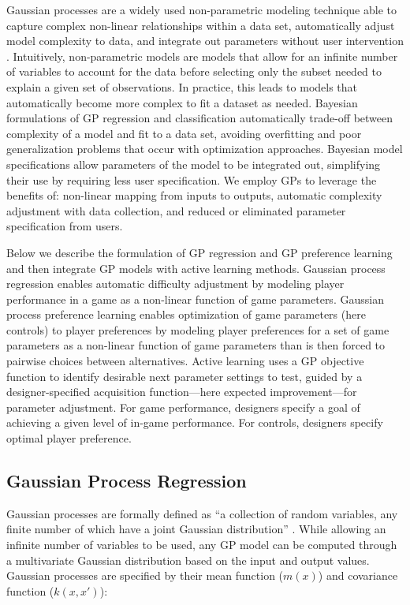 \documentclass[letterpaper]{article}
\begin{document}
Gaussian processes are a widely used non-parametric modeling technique able to capture complex non-linear relationships within a data set, automatically adjust model complexity to data, and integrate out parameters without user intervention \cite{rasmussen2006}. Intuitively, non-parametric models are models that allow for an infinite number of variables to account for the data before selecting only the subset needed to explain a given set of observations. In practice, this leads to models that automatically become more complex to fit a dataset as needed. Bayesian formulations of GP regression and classification automatically trade-off between complexity of a model and fit to a data set, avoiding overfitting and poor generalization problems that occur with optimization approaches. Bayesian model specifications allow parameters of the model to be integrated out, simplifying their use by requiring less user specification. We employ GPs to leverage the benefits of: non-linear mapping from inputs to outputs, automatic complexity adjustment with data collection, and reduced or eliminated parameter specification from users.

Below we describe the formulation of GP regression and GP preference learning and then integrate GP models with active learning methods. Gaussian process regression enables automatic difficulty adjustment by modeling player performance in a game as a non-linear function of game parameters. Gaussian process preference learning enables optimization of game parameters (here controls) to player preferences by modeling player preferences for a set of game parameters as a non-linear function of game parameters than is then forced to pairwise choices between alternatives. Active learning uses a GP objective function to identify desirable next parameter settings to test, guided by a designer-specified acquisition function---here expected improvement---for parameter adjustment. For game performance, designers specify a goal of achieving a given level of in-game performance. For controls, designers specify optimal player preference.

\subsection{Gaussian Process Regression}
Gaussian processes are formally defined as ``a collection of random variables, any finite number of which have a joint Gaussian distribution'' \cite{rasmussen2006}. While allowing an infinite number of variables to be used, any GP model can be computed through a multivariate Gaussian distribution based on the input and output values. Gaussian processes are specified by their mean function ($m(x)$) and covariance function ($k(x,x')$):
\end{document}
